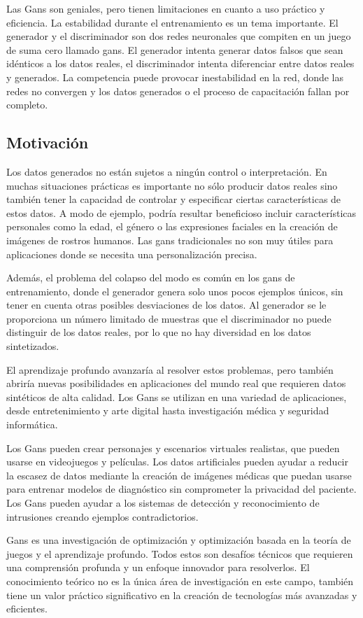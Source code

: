 Las Gans son geniales, pero tienen limitaciones en cuanto a uso práctico y eficiencia. La estabilidad durante el entrenamiento es un tema importante. El generador y el discriminador son dos redes neuronales que compiten en un juego de suma cero llamado gans. El generador intenta generar datos falsos que sean idénticos a los datos reales, el discriminador intenta diferenciar entre datos reales y generados. La competencia puede provocar inestabilidad en la red, donde las redes no convergen y los datos generados o el proceso de capacitación fallan por completo.
\subsection{Motivación}
Los datos generados no están sujetos a ningún control o interpretación. En muchas situaciones prácticas es importante no sólo producir datos reales sino también tener la capacidad de controlar y especificar ciertas características de estos datos. A modo de ejemplo, podría resultar beneficioso incluir características personales como la edad, el género o las expresiones faciales en la creación de imágenes de rostros humanos. Las gans tradicionales no son muy útiles para aplicaciones donde se necesita una personalización precisa.

Además, el problema del colapso del modo es común en los gans de entrenamiento, donde el generador genera solo unos pocos ejemplos únicos, sin tener en cuenta otras posibles desviaciones de los datos. Al generador se le proporciona un número limitado de muestras que el discriminador no puede distinguir de los datos reales, por lo que no hay diversidad en los datos sintetizados.

El aprendizaje profundo avanzaría al resolver estos problemas, pero también abriría nuevas posibilidades en aplicaciones del mundo real que requieren datos sintéticos de alta calidad. Los Gans se utilizan en una variedad de aplicaciones, desde entretenimiento y arte digital hasta investigación médica y seguridad informática.


Los Gans pueden crear personajes y escenarios virtuales realistas, que pueden usarse en videojuegos y películas. Los datos artificiales pueden ayudar a reducir la escasez de datos mediante la creación de imágenes médicas que puedan usarse para entrenar modelos de diagnóstico sin comprometer la privacidad del paciente. Los Gans pueden ayudar a los sistemas de detección y reconocimiento de intrusiones creando ejemplos contradictorios.

Gans es una investigación de optimización y optimización basada en la teoría de juegos y el aprendizaje profundo. Todos estos son desafíos técnicos que requieren una comprensión profunda y un enfoque innovador para resolverlos. El conocimiento teórico no es la única área de investigación en este campo, también tiene un valor práctico significativo en la creación de tecnologías más avanzadas y eficientes.

